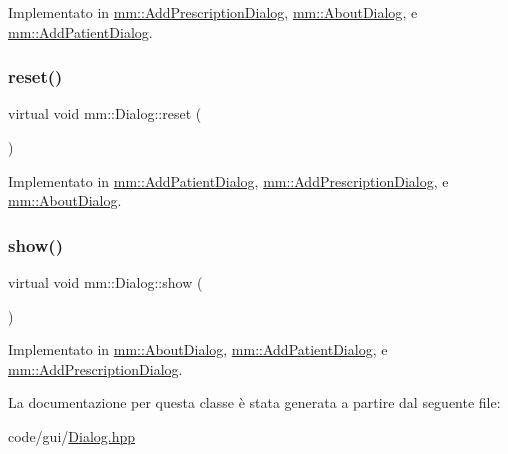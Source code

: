 Implementato in \hyperlink{classmm_1_1_add_prescription_dialog_a4ff93500e8fd90512dc4575147b2c910}{mm\+::\+Add\+Prescription\+Dialog}, \hyperlink{classmm_1_1_about_dialog_adc8aec0378d9d146c78eaf9a204dbf27}{mm\+::\+About\+Dialog}, e \hyperlink{classmm_1_1_add_patient_dialog_a459a8acbec1c8a5a87e00f23402d3b5d}{mm\+::\+Add\+Patient\+Dialog}.

\mbox{\label{classmm_1_1_dialog_abe6e5ac072c12c06971f60491f079d80}} 
\subsubsection{\texorpdfstring{reset()}{reset()}}
{\footnotesize\ttfamily virtual void mm\+::\+Dialog\+::reset (\begin{DoxyParamCaption}{ }\end{DoxyParamCaption})\hspace{0.3cm}{\ttfamily [pure virtual]}}



Implementato in \hyperlink{classmm_1_1_add_patient_dialog_a64c8c2ea3b1c69a858f4eaec1854270a}{mm\+::\+Add\+Patient\+Dialog}, \hyperlink{classmm_1_1_add_prescription_dialog_a6ace04587432a197436bb04c7b68d60d}{mm\+::\+Add\+Prescription\+Dialog}, e \hyperlink{classmm_1_1_about_dialog_a21f5b0a7c9d8e43baab78e073d7ade2b}{mm\+::\+About\+Dialog}.

\mbox{\label{classmm_1_1_dialog_afda4b0dc7c0ac027c4b8fdb95713700f}} 
\subsubsection{\texorpdfstring{show()}{show()}}
{\footnotesize\ttfamily virtual void mm\+::\+Dialog\+::show (\begin{DoxyParamCaption}{ }\end{DoxyParamCaption})\hspace{0.3cm}{\ttfamily [pure virtual]}}



Implementato in \hyperlink{classmm_1_1_about_dialog_a9e06dc12f6950b74ccf6ccece693f108}{mm\+::\+About\+Dialog}, \hyperlink{classmm_1_1_add_patient_dialog_a0247912794984eb19c43842ab9037708}{mm\+::\+Add\+Patient\+Dialog}, e \hyperlink{classmm_1_1_add_prescription_dialog_aa1c86141b2d45e141684bd99d557b8e4}{mm\+::\+Add\+Prescription\+Dialog}.



La documentazione per questa classe è stata generata a partire dal seguente file\+:\begin{DoxyCompactItemize}
\item 
code/gui/\hyperlink{_dialog_8hpp}{Dialog.\+hpp}\end{DoxyCompactItemize}
